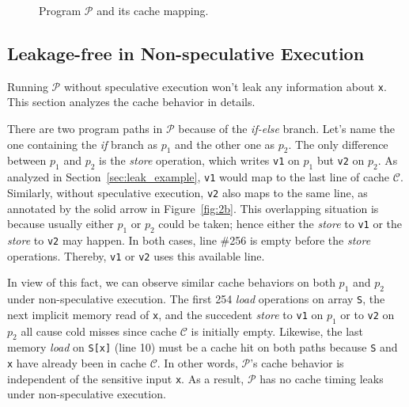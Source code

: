 \documentclass[sigconf]{acmart}
\newcommand{\prog}{\mathcal{P}}
\begin{document}
\begin{figure}
{\begin{minipage}{0.3\linewidth}
\end{minipage}
}
\vspace{-3ex}
\caption{Program $\mathcal{P}$ and its cache mapping.}
\label{fig:motiv}
\end{figure}


\subsection{Leakage-free in Non-speculative Execution}
\label{sec:no_leak}

Running $\prog$ without speculative execution won't leak any information 
about \texttt{x}. This section analyzes the cache behavior in details. 


There are two program paths in $\prog$ because of the \textit{if-else} 
branch. Let's name the one containing the \textit{if} branch as $p_1$ 
and the other one as $p_2$. The only difference between $p_1$ and $p_2$
is the \emph{store} operation, which writes \texttt{v1} on $p_1$ but 
\texttt{v2} on $p_2$. As analyzed in Section~\ref{sec:leak_example}, 
\texttt{v1} would map to the last line of cache $\mathcal{C}$. Similarly, 
without speculative execution, \texttt{v2} also maps to the same line, as 
annotated by the solid arrow in Figure~\ref{fig:2b}. This overlapping 
situation is because usually either $p_1$ or $p_2$ could be taken; 
hence either the \textit{store} to \texttt{v1} or the \textit{store} 
to \texttt{v2} may happen. In both cases, line \#256 is empty before 
the \textit{store} operations. Thereby, \texttt{v1} or \texttt{v2} 
uses this available line.


In view of this fact, we can observe similar cache behaviors on both $p_1$ 
and $p_2$ under non-speculative execution. The first 254 \emph{load} 
operations on array \texttt{S}, the next implicit memory read of \texttt{x},
and the succedent \textit{store} to \texttt{v1} on $p_1$ or to \texttt{v2} 
on $p_2$ all cause cold misses since cache $\mathcal{C}$ is initially empty. 
Likewise, the last memory \emph{load} on \texttt{S[x]} (line 10) must be a 
cache hit on both paths because \texttt{S} and \texttt{x} have already been 
in cache $\mathcal{C}$. In other words, $\prog$'s cache behavior is 
independent of the sensitive input \texttt{x}. As a result, $\prog$ has no 
cache timing leaks under non-speculative execution.
\end{document}
